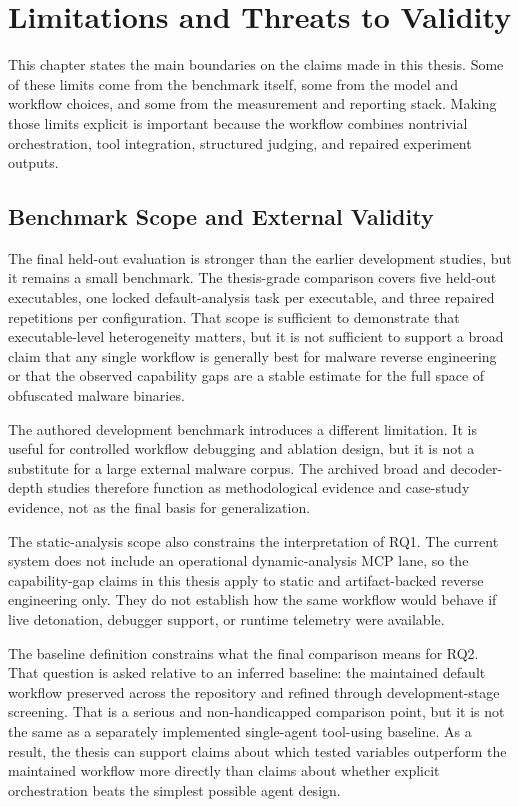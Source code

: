 \chapter{Limitations and Threats to Validity}
\label{sec:limitations}

This chapter states the main boundaries on the claims made in this thesis. Some of these limits come from the benchmark itself, some from the model and workflow choices, and some from the measurement and reporting stack. Making those limits explicit is important because the workflow combines nontrivial orchestration, tool integration, structured judging, and repaired experiment outputs.

\section{Benchmark Scope and External Validity}

The final held-out evaluation is stronger than the earlier development studies, but it remains a small benchmark. The thesis-grade comparison covers five held-out executables, one locked default-analysis task per executable, and three repaired repetitions per configuration. That scope is sufficient to demonstrate that executable-level heterogeneity matters, but it is not sufficient to support a broad claim that any single workflow is generally best for malware reverse engineering or that the observed capability gaps are a stable estimate for the full space of obfuscated malware binaries.

The authored development benchmark introduces a different limitation. It is useful for controlled workflow debugging and ablation design, but it is not a substitute for a large external malware corpus. The archived broad and decoder-depth studies therefore function as methodological evidence and case-study evidence, not as the final basis for generalization.

The static-analysis scope also constrains the interpretation of RQ1. The current system does not include an operational dynamic-analysis MCP lane, so the capability-gap claims in this thesis apply to static and artifact-backed reverse engineering only. They do not establish how the same workflow would behave if live detonation, debugger support, or runtime telemetry were available.

The baseline definition constrains what the final comparison means for RQ2. That question is asked relative to an inferred baseline: the maintained default workflow preserved across the repository and refined through development-stage screening. That is a serious and non-handicapped comparison point, but it is not the same as a separately implemented single-agent tool-using baseline. As a result, the thesis can support claims about which tested variables outperform the maintained workflow more directly than claims about whether explicit orchestration beats the simplest possible agent design.

